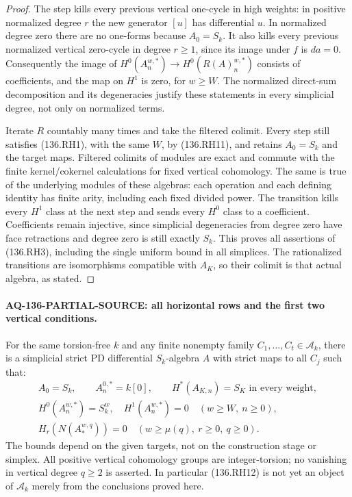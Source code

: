 \begin{proof}
The step kills every previous vertical one-cycle in high
weights: in positive normalized degree $r$ the new generator
$[u]$ has differential $u$. In normalized degree zero there
are no one-forms because $A_0=S_k$. It also kills every
previous normalized vertical zero-cycle in degree $r\ge1$,
since its image under $f$ is $da=0$. Consequently the image
of $H^0(A_n^{w,*})\to H^0(R(A)_n^{w,*})$ consists of
coefficients, and the map on $H^1$ is zero, for $w\ge W$.
The normalized direct-sum decomposition and its degeneracies
justify these statements in every simplicial degree, not only
on normalized terms.

Iterate $R$ countably many times and take the filtered colimit.
Every step still satisfies (136.RH1), with the same $W$, by
(136.RH11), and retains $A_0=S_k$ and the target maps.
Filtered colimits of modules are exact and commute with the
finite kernel/cokernel calculations for fixed vertical
cohomology. The same is true of the underlying modules of
these algebras: each operation and each defining identity
has finite arity, including each fixed divided power.
The transition kills every $H^1$ class at the next step and
sends every $H^0$ class to a coefficient. Coefficients remain
injective, since simplicial degeneracies from degree zero have
face retractions and degree zero is still exactly $S_k$.
This proves all assertions of (136.RH3), including the single
uniform bound in all simplices. The rationalized transitions
are isomorphisms compatible with $A_K$, so their colimit is
that actual algebra, as stated.
\end{proof}

\paragraph{AQ-136-PARTIAL-SOURCE: all horizontal rows and the first two vertical conditions.}
For the same torsion-free $k$ and any finite nonempty family
$C_1,\ldots,C_t\in\mathcal A_k$, there is a simplicial strict
PD differential $S_k$-algebra $A$ with strict maps to all $C_j$
such that:
\[
 \begin{gathered}
 A_0=S_k,\qquad A_n^{0,*}=k[0],\qquad H^*(A_{K,n})=S_K
                                   \text{ in every weight},\\
 H^0(A_n^{w,*})=S_k^w,\quad H^1(A_n^{w,*})=0
                        \quad(w\ge W,\ n\ge0),\\
 H_r(N(A_*^{w,q}))=0
                   \quad(w\ge\mu(q),\ r\ge0,\ q\ge0).
 \end{gathered}                                             \tag{136.RH12}
\]
The bounds depend on the given targets, not on the construction
stage or simplex. All positive vertical cohomology groups are
integer-torsion; no vanishing in vertical degree $q\ge2$ is
asserted. In particular (136.RH12) is not yet an object of
$\mathcal A_k$ merely from the conclusions proved here.

